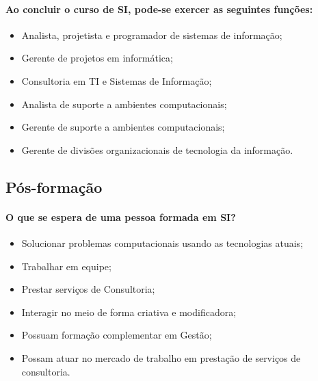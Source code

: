  \paragraph{Ao concluir o curso de SI, pode-se exercer as seguintes funções:}
       \begin{itemize}
           \item Analista, projetista e programador de sistemas de informação;
           \item Gerente de projetos em informática;
           \item Consultoria em TI e Sistemas de Informação;
           \item Analista de suporte a ambientes computacionais;
           \item Gerente de suporte a ambientes computacionais;
           \item Gerente de divisões organizacionais de tecnologia da informação.
       \end{itemize}
       
\subsection{Pós-formação}
 \paragraph{O que se espera de uma pessoa formada em SI?}
    \begin{itemize}
        \item Solucionar problemas computacionais usando as tecnologias atuais;
        \item Trabalhar em equipe;
        \item  Prestar serviços de Consultoria;
        \item Interagir no meio de forma criativa e modificadora;
        \item Possuam formação complementar em Gestão;
        \item Possam atuar no mercado de trabalho em prestação de serviços de consultoria.
        \end{itemize}

